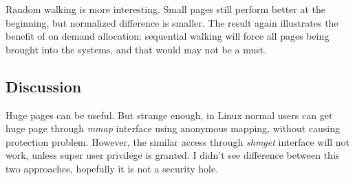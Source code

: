 Random walking is more interesting. Small pages still perform better at the 
beginning, but normalized difference is smaller. The result again illustrates
the benefit of on demand allocation: sequential walking will force all pages
being brought into the systems, and that would may not be a must.

\subsection{Discussion}
Huge pages can be useful. But strange enough, in Linux normal users can get
huge page through \emph{mmap} interface using anonymous mapping, without
causing protection problem.  However, the similar access through \emph{shmget}
interface will not work, unless super user privilege is granted. I didn't 
see difference between this two approaches, hopefully it is not a security
hole.
